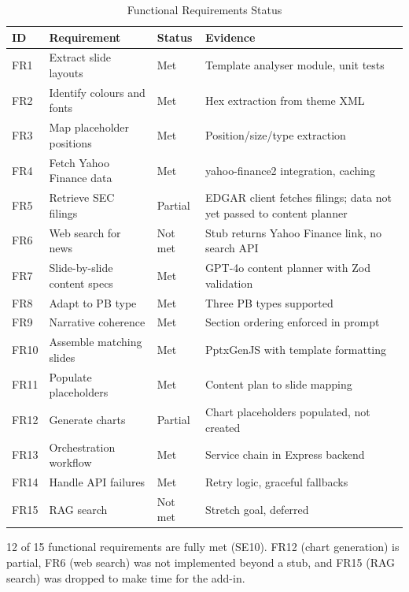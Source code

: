 \begin{table}[H]
\centering
\begin{tabular}{|l|p{3.8cm}|l|p{5.5cm}|}
\hline
\rowcolor{gray!20} \textbf{ID} & \textbf{Requirement} & \textbf{Status} & \textbf{Evidence} \\
\hline
FR1 & Extract slide layouts & Met & Template analyser module, unit tests \\
\hline
FR2 & Identify colours and fonts & Met & Hex extraction from theme XML \\
\hline
FR3 & Map placeholder positions & Met & Position/size/type extraction \\
\hline
FR4 & Fetch Yahoo Finance data & Met & yahoo-finance2 integration, caching \\
\hline
FR5 & Retrieve SEC filings & Partial & EDGAR client fetches filings; data not yet passed to content planner \\
\hline
FR6 & Web search for news & Not met & Stub returns Yahoo Finance link, no search API \\
\hline
FR7 & Slide-by-slide content specs & Met & GPT-4o content planner with Zod validation \\
\hline
FR8 & Adapt to PB type & Met & Three PB types supported \\
\hline
FR9 & Narrative coherence & Met & Section ordering enforced in prompt \\
\hline
FR10 & Assemble matching slides & Met & PptxGenJS with template formatting \\
\hline
FR11 & Populate placeholders & Met & Content plan to slide mapping \\
\hline
FR12 & Generate charts & Partial & Chart placeholders populated, not created \\
\hline
FR13 & Orchestration workflow & Met & Service chain in Express backend \\
\hline
FR14 & Handle API failures & Met & Retry logic, graceful fallbacks \\
\hline
FR15 & RAG search & Not met & Stretch goal, deferred \\
\hline
\end{tabular}
\caption{Functional Requirements Status}
\label{tab:req-evidence}
\end{table}

12 of 15 functional requirements are fully met (SE10). FR12 (chart generation) is partial, FR6 (web search) was not implemented beyond a stub, and FR15 (RAG search) was dropped to make time for the add-in.



